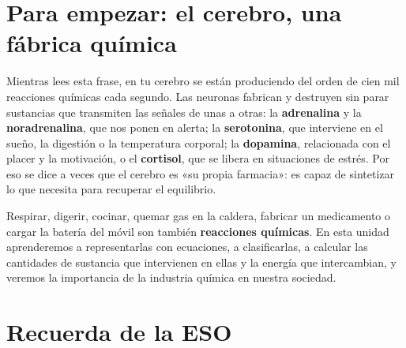 
\section*{Para empezar: el cerebro, una fábrica química}

Mientras lees esta frase, en tu cerebro se están produciendo del orden de cien mil reacciones químicas cada segundo. Las neuronas
fabrican y destruyen sin parar sustancias que transmiten las señales de unas a otras: la \textbf{adrenalina} y la
\textbf{noradrenalina}, que nos ponen en alerta; la \textbf{serotonina}, que interviene en el sueño, la digestión o la temperatura
corporal; la \textbf{dopamina}, relacionada con el placer y la motivación, o el \textbf{cortisol}, que se libera en situaciones de
estrés. Por eso se dice a veces que el cerebro es «su propia farmacia»: es capaz de sintetizar lo que necesita para recuperar el
equilibrio.

Respirar, digerir, cocinar, quemar gas en la caldera, fabricar un medicamento o cargar la batería del móvil son también
\textbf{reacciones químicas}. En esta unidad aprenderemos a representarlas con ecuaciones, a clasificarlas, a calcular las
cantidades de sustancia que intervienen en ellas y la energía que intercambian, y veremos la importancia de la industria química
en nuestra sociedad.

\section{Recuerda de la ESO}\label{sec:ud6-eso}

